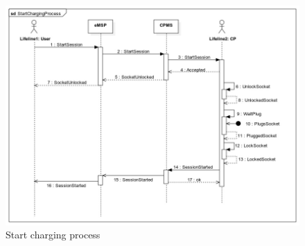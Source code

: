 \documentclass{Configuration_Files/PoliMi3i_thesis}
\begin{document}
\begin{figure}[H]
    \centering
    \includegraphics[width=1\textwidth]{Images/UseCases/StartChargingProcess.jpg}
    \caption{Start charging process}
\end{figure}

\end{document}
